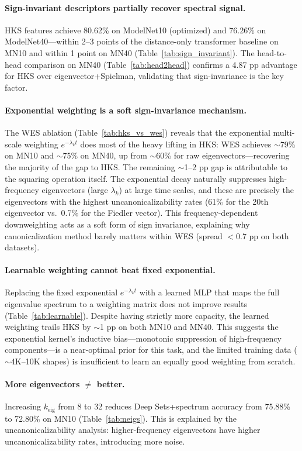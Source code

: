 \documentclass[11pt]{article}
\begin{document}
\paragraph{Sign-invariant descriptors partially recover spectral signal.}
HKS features achieve 80.62\% on ModelNet10 (optimized) and 76.26\% on ModelNet40---within
2--3 points of the distance-only transformer baseline on MN10 and within 1 point on MN40
(Table~\ref{tab:sign_invariant}). The head-to-head comparison on MN40
(Table~\ref{tab:head2head}) confirms a 4.87 pp advantage for HKS over eigenvector+Spielman,
validating that sign-invariance is the key factor.

\paragraph{Exponential weighting is a soft sign-invariance mechanism.}
The WES ablation (Table~\ref{tab:hks_vs_wes}) reveals that the exponential multi-scale
weighting $e^{-\lambda_k t}$ does most of the heavy lifting in HKS: WES achieves
$\sim$79\% on MN10 and $\sim$75\% on MN40, up from $\sim$60\% for raw eigenvectors---recovering
the majority of the gap to HKS. The remaining $\sim$1--2 pp gap is attributable to the
squaring operation itself. The exponential decay naturally suppresses high-frequency
eigenvectors (large $\lambda_k$) at large time scales, and these are precisely the
eigenvectors with the highest uncanonicalizability rates (61\% for the 20th eigenvector
vs.\ 0.7\% for the Fiedler vector). This frequency-dependent downweighting acts as a soft
form of sign invariance, explaining why canonicalization method barely matters within WES
(spread $<$0.7 pp on both datasets).

\paragraph{Learnable weighting cannot beat fixed exponential.}
Replacing the fixed exponential $e^{-\lambda_k t}$ with a learned MLP that maps the full
eigenvalue spectrum to a weighting matrix does not improve results
(Table~\ref{tab:learnable}). Despite having strictly more capacity, the learned weighting
trails HKS by $\sim$1 pp on both MN10 and MN40. This suggests the exponential kernel's
inductive bias---monotonic suppression of high-frequency components---is a near-optimal
prior for this task, and the limited training data ($\sim$4K--10K shapes) is insufficient
to learn an equally good weighting from scratch.

\paragraph{More eigenvectors $\neq$ better.}
Increasing $k_{\text{eig}}$ from 8 to 32 reduces Deep Sets+spectrum accuracy from 75.88\%
to 72.80\% on MN10 (Table~\ref{tab:neigs}). This is explained by the uncanonicalizability
analysis: higher-frequency eigenvectors have higher uncanonicalizability rates, introducing
more noise.
\end{document}
